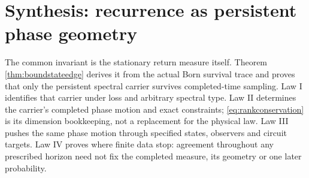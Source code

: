 \section{Synthesis: recurrence as persistent phase geometry}

The common invariant is the stationary return measure itself.  Theorem
\ref{thm:boundstateedge} derives it from the actual Born survival trace and
proves that only the persistent spectral carrier survives completed-time
sampling.  Law I identifies that carrier under loss and arbitrary spectral
type.  Law II determines the carrier's completed phase motion and exact
constraints; \eqref{eq:rankconservation} is its dimension bookkeeping, not a
replacement for the physical law.  Law III pushes the same phase motion
through specified states, observers and circuit targets.  Law IV proves where
finite data stop: agreement throughout any prescribed horizon need not fix
the completed measure, its geometry or one later probability.

